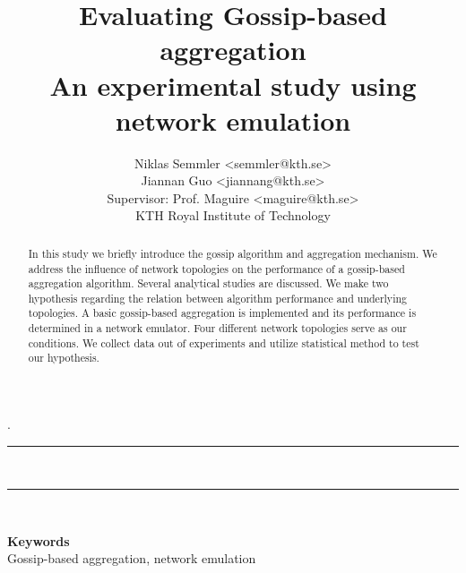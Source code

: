 \documentclass[11pt,a4paper]{scrartcl}
\date{}
\title{Evaluating Gossip-based aggregation\\{\large An experimental study using network emulation}}
\author{Niklas Semmler <semmler@kth.se>\\
Jiannan Guo <jiannang@kth.se>\\[0,25cm]
Supervisor: Prof. Maguire <maguire@kth.se>\\
KTH Royal Institute of Technology}%
\def\keywords#1{\begin{center}{\bf Keywords}\\{#1}\end{center}} %
\begin{document}
%
\maketitle
\newcommand{\HRule}{\rule{\linewidth}{0.5mm}}
{.} \\
\HRule \\
\begin{abstract}
In this study we briefly introduce the gossip algorithm and aggregation mechanism. We address the influence of network topologies on the performance of a gossip-based aggregation algorithm. Several analytical studies are discussed. We make two hypothesis regarding the relation between algorithm performance and underlying topologies. A basic gossip-based aggregation is implemented and its performance is determined in a network emulator. Four different network topologies serve as our conditions. We collect data out of experiments and utilize statistical method to test our hypothesis.
\end{abstract}
\HRule \\
\keywords{Gossip-based aggregation, network emulation}%













\appendix
\end{document}
